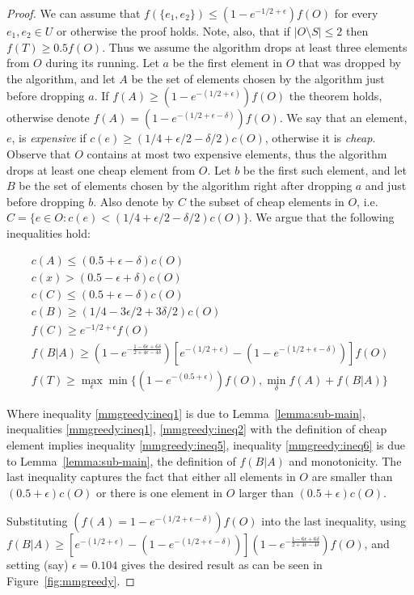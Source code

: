 \def\eps{0.104}
\begin{proof}
We can assume that $f(\{e_1, e_2\}) \leq (1 - e^{-1/2 + \epsilon})f(O)$ 
for every $e_1, e_2 \in U$ or otherwise the proof holds.
Note, also, that if $|O \setminus S| \leq 2$ then $f(T) \geq 0.5f(O)$.
Thus we assume the algorithm drops at least three elements from $O$ during its running.
Let $a$ be the first element in $O$ that was dropped by the algorithm, 
and let $A$ be the set of elements chosen by the algorithm just before dropping $a$.
If $f(A) \geq (1 - e^{-(1/2 + \epsilon)})f(O)$ the theorem holds, 
otherwise denote $f(A) = (1 - e^{-(1/2 + \epsilon - \delta)})f(O)$.
We say that an element, $e$, is \emph{expensive} if $c(e) \geq (1/4 + \epsilon/2 - \delta/2)c(O)$, 
otherwise it is \emph{cheap}.
Observe that $O$ contains at most two expensive elements, thus the algorithm drops 
at least one cheap element from $O$. 
Let $b$ be the first such element, and let $B$ be the set of elements chosen by the 
algorithm right after dropping $a$ and just before dropping $b$.
Also denote by $C$ the subset of cheap elements in $O$, 
i.e. $C = \{e \in O : c(e) < (1/4 + \epsilon/2 - \delta/2)c(O)\}$.
We argue that the following inequalities hold:

\begin{align}
\label{mmgreedy:ineq1}
c(A) \leq (0.5 + \epsilon - \delta)c(O)
\\
\label{mmgreedy:ineq2}
c(x) > (0.5 -\epsilon + \delta)c(O)
\\
\label{mmgreedy:ineq3}
c(C) \leq (0.5 + \epsilon - \delta)c(O)
\\
\label{mmgreedy:ineq5}
c(B) \geq (1/4 - 3\epsilon/2 + 3\delta/2)c(O)
\\
\label{mmgreedy:ineq4}
f(C) \geq e^{-1/2 + \epsilon}f(O)
\\
\label{mmgreedy:ineq6}
f(B|A) \geq 
(1-e^{-\frac{1-6\epsilon+6\delta}{2+4\epsilon-4\delta}})
\left[
e^{-(1/2 + \epsilon)}
- (1 - e^{-(1/2 + \epsilon - \delta)})
\right]f(O)
\\
\label{mmgreedy:ineq7}
f(T) \geq \max_\epsilon \min \{(1 - e^{-(0.5 + \epsilon)})f(O), \min_{\delta} f(A) + f(B|A)\}
\end{align}

Where inequality \ref{mmgreedy:ineq1} is due to Lemma~\ref{lemma:sub-main},
inequalities \ref{mmgreedy:ineq1}, \ref{mmgreedy:ineq2} with the definition of cheap
element implies inequality \ref{mmgreedy:ineq5},
inequality \ref{mmgreedy:ineq6} is due to Lemma~\ref{lemma:sub-main}, the definition
of $f(B|A)$ and monotonicity.
The last inequality captures the fact that either all elements in $O$ are smaller than
$(0.5 + \epsilon)c(O)$ or there is one element in $O$ larger than $(0.5 + \epsilon)c(O)$.


Substituting $(f(A) = 1 - e^{-(1/2 + \epsilon - \delta)})f(O)$ into the last inequality, using $f(B|A) \ge \left[
e^{-(1/2 + \epsilon)}
- (1 - e^{-(1/2 + \epsilon - \delta)})
\right]
(1-e^{-\frac{1-6\epsilon+6\delta}{2+4\epsilon-4\delta}})f(O)$,
and setting (say) $\epsilon = \eps$ gives the desired result 
as can be seen in Figure~\ref{fig:mmgreedy}.

\end{proof}

